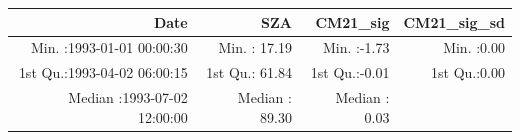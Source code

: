 \documentclass[
  10pt,
  a4paper,oneside]{article}
\begin{document}
\begin{longtable}[]{@{}rrrr@{}}
\toprule
\begin{minipage}[b]{0.34\columnwidth}\raggedleft
Date\strut
\end{minipage} & \begin{minipage}[b]{0.19\columnwidth}\raggedleft
SZA\strut
\end{minipage} & \begin{minipage}[b]{0.18\columnwidth}\raggedleft
CM21\_sig\strut
\end{minipage} & \begin{minipage}[b]{0.18\columnwidth}\raggedleft
CM21\_sig\_sd\strut
\end{minipage}\tabularnewline
\midrule
\endhead
\begin{minipage}[t]{0.34\columnwidth}\raggedleft
Min. :1993-01-01 00:00:30\strut
\end{minipage} & \begin{minipage}[t]{0.19\columnwidth}\raggedleft
Min. : 17.19\strut
\end{minipage} & \begin{minipage}[t]{0.18\columnwidth}\raggedleft
Min. :-1.73\strut
\end{minipage} & \begin{minipage}[t]{0.18\columnwidth}\raggedleft
Min. :0.00\strut
\end{minipage}\tabularnewline
\begin{minipage}[t]{0.34\columnwidth}\raggedleft
1st Qu.:1993-04-02 06:00:15\strut
\end{minipage} & \begin{minipage}[t]{0.19\columnwidth}\raggedleft
1st Qu.: 61.84\strut
\end{minipage} & \begin{minipage}[t]{0.18\columnwidth}\raggedleft
1st Qu.:-0.01\strut
\end{minipage} & \begin{minipage}[t]{0.18\columnwidth}\raggedleft
1st Qu.:0.00\strut
\end{minipage}\tabularnewline
\begin{minipage}[t]{0.34\columnwidth}\raggedleft
Median :1993-07-02 12:00:00\strut
\end{minipage} & \begin{minipage}[t]{0.19\columnwidth}\raggedleft
Median : 89.30\strut
\end{minipage} & \begin{minipage}[t]{0.18\columnwidth}\raggedleft
Median : 0.03\strut
\end{minipage} & \begin{minipage}[t]{0.18\columnwidth}\raggedleft

\end{minipage}
\end{longtable}
\end{document}
